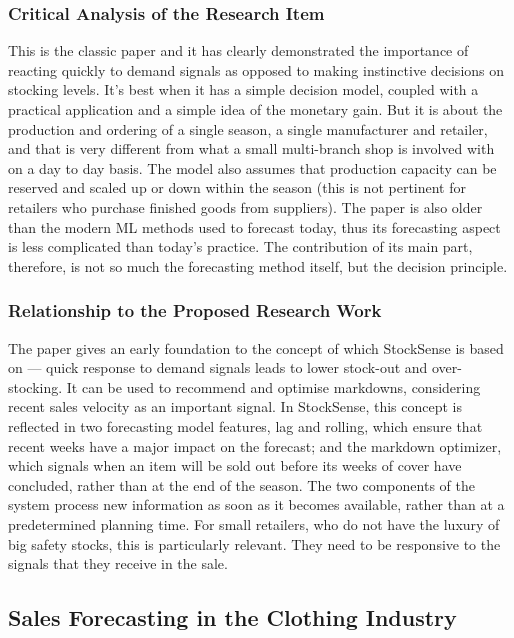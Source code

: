 \documentclass{StockSense}
\begin{document}
\subsubsection{Critical Analysis of the Research Item}

This is the classic paper and it has clearly demonstrated the importance of reacting quickly to demand signals as opposed to making instinctive decisions on stocking levels. It's best when it has a simple decision model, coupled with a practical application and a simple idea of the monetary gain. But it is about the production and ordering of a single season, a single manufacturer and retailer, and that is very different from what a small multi-branch shop is involved with on a day to day basis. The model also assumes that production capacity can be reserved and scaled up or down within the season (this is not pertinent for retailers who purchase finished goods from suppliers). The paper is also older than the modern ML methods used to forecast today, thus its forecasting aspect is less complicated than today's practice. The contribution of its main part, therefore, is not so much the forecasting method itself, but the decision principle.

\subsubsection{Relationship to the Proposed Research Work}

The paper gives an early foundation to the concept of which StockSense is based on --- quick response to demand signals leads to lower stock-out and over-stocking. It can be used to recommend and optimise markdowns, considering recent sales velocity as an important signal. In StockSense, this concept is reflected in two forecasting model features, lag and rolling, which ensure that recent weeks have a major impact on the forecast; and the markdown optimizer, which signals when an item will be sold out before its weeks of cover have concluded, rather than at the end of the season. The two components of the system process new information as soon as it becomes available, rather than at a predetermined planning time. For small retailers, who do not have the luxury of big safety stocks, this is particularly relevant. They need to be responsive to the signals that they receive in the sale.

\subsection{Sales Forecasting in the Clothing Industry}
\end{document}
